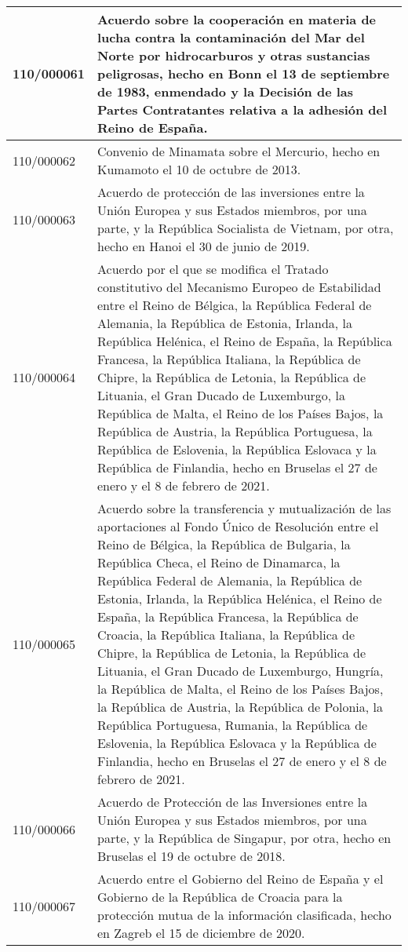 {\begin{table}[H]
\begin{center}
\begin{tabularx}{\linewidth}{| l | X |}
\hline
110/000061 & Acuerdo sobre la cooperación en materia de lucha contra la contaminación del Mar del Norte por hidrocarburos y otras sustancias peligrosas, hecho en Bonn el 13 de septiembre de 1983, enmendado y la Decisión de las Partes Contratantes relativa a la adhesión del Reino de España. \\
\hline
110/000062 & Convenio de Minamata sobre el Mercurio, hecho en Kumamoto el 10 de octubre de 2013. \\
\hline
110/000063 & Acuerdo de protección de las inversiones entre la Unión Europea y sus Estados miembros, por una parte, y la República Socialista de Vietnam, por otra, hecho en Hanoi el 30 de junio de 2019. \\
\hline
110/000064 & Acuerdo por el que se modifica el Tratado constitutivo del Mecanismo Europeo de Estabilidad entre el Reino de Bélgica, la República Federal de Alemania, la República de Estonia, Irlanda, la República Helénica, el Reino de España, la República Francesa, la República Italiana, la República de Chipre, la República de Letonia, la República de Lituania, el Gran Ducado de Luxemburgo, la República de Malta, el Reino de los Países Bajos, la República de Austria, la República Portuguesa, la República de Eslovenia, la República Eslovaca y la República de Finlandia, hecho en Bruselas el 27 de enero y el 8 de febrero de 2021. \\
\hline
110/000065 & Acuerdo sobre la transferencia y mutualización de las aportaciones al Fondo Único de Resolución entre el Reino de Bélgica, la República de Bulgaria, la República Checa, el Reino de Dinamarca, la República Federal de Alemania, la República de Estonia, Irlanda, la República Helénica, el Reino de España, la República Francesa, la República de Croacia, la República Italiana, la República de Chipre, la República de Letonia, la República de Lituania, el Gran Ducado de Luxemburgo, Hungría, la República de Malta, el Reino de los Países Bajos, la República de Austria, la República de Polonia, la República Portuguesa, Rumania, la República de Eslovenia, la República Eslovaca y la República de Finlandia, hecho en Bruselas el 27 de enero y el 8 de febrero de 2021. \\
\hline
110/000066 & Acuerdo de Protección de las Inversiones entre la Unión Europea y sus Estados miembros, por una parte, y la República de Singapur, por otra, hecho en Bruselas el 19 de octubre de 2018. \\
\hline
110/000067 & Acuerdo entre el Gobierno del Reino de España y el Gobierno de la República de Croacia para la protección mutua de la información clasificada, hecho en Zagreb el 15 de diciembre de 2020. \\

\end{tabularx}
\end{center}
\end{table}}
